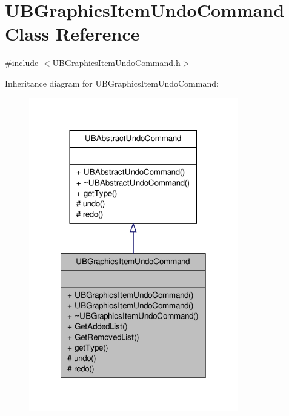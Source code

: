 \hypertarget{class_u_b_graphics_item_undo_command}{\section{U\-B\-Graphics\-Item\-Undo\-Command Class Reference}
\label{d2/df2/class_u_b_graphics_item_undo_command}
}


{\ttfamily \#include $<$U\-B\-Graphics\-Item\-Undo\-Command.\-h$>$}



Inheritance diagram for U\-B\-Graphics\-Item\-Undo\-Command\-:
\nopagebreak
\begin{figure}[H]
\begin{center}
\leavevmode
\includegraphics[width=258pt]{d4/dec/class_u_b_graphics_item_undo_command__inherit__graph}
\end{center}
\end{figure}


